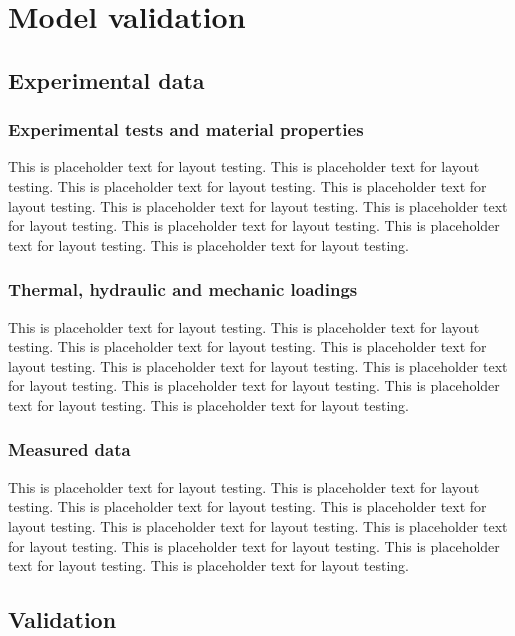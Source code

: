 \documentclass[a4paper,12pt,twoside]{report}     %
\begin{document}

\cleardoublepage
\chapter{Model validation}

\section{Experimental data}
\subsection{Experimental tests and material properties}
This is placeholder text for layout testing. This is placeholder text for layout testing. This is placeholder text for layout testing. This is placeholder text for layout testing. This is placeholder text for layout testing. This is placeholder text for layout testing. This is placeholder text for layout testing. This is placeholder text for layout testing. This is placeholder text for layout testing.
\subsection{Thermal, hydraulic and mechanic loadings}
This is placeholder text for layout testing. This is placeholder text for layout testing. This is placeholder text for layout testing. This is placeholder text for layout testing. This is placeholder text for layout testing. This is placeholder text for layout testing. This is placeholder text for layout testing. This is placeholder text for layout testing. This is placeholder text for layout testing.
\subsection{Measured data}
This is placeholder text for layout testing. This is placeholder text for layout testing. This is placeholder text for layout testing. This is placeholder text for layout testing. This is placeholder text for layout testing. This is placeholder text for layout testing. This is placeholder text for layout testing. This is placeholder text for layout testing. This is placeholder text for layout testing.

\section{Validation}
\end{document}
